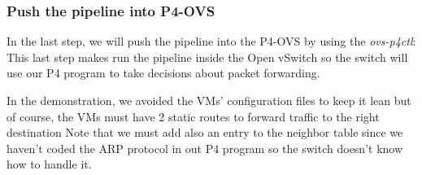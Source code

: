 \documentclass[../sn.tex]{subfiles}
\begin{document}
\subsubsection*{Push the pipeline into P4-OVS}
In the last step, we will push the pipeline into the P4-OVS by using the \emph{ovs-p4ctl}:
This last step makes run the pipeline inside the Open vSwitch so the switch will use our P4 program to take decisions about packet forwarding.

In the demonstration, we avoided the VMs' configuration files to keep it lean but of course, the VMs must have 2 static routes to forward traffic to the right destination
Note that we must add also an entry to the neighbor table since we haven't coded the ARP protocol in out P4 program so the switch doesn't know how to handle it.
\clearpage
\end{document}
